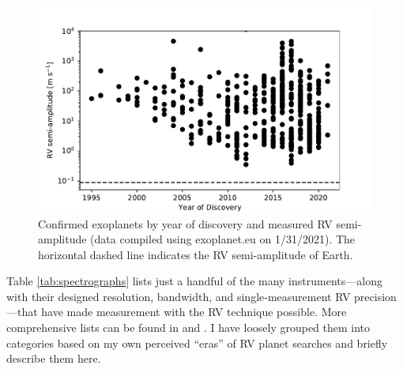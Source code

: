 \begin{figure}
    \centering
    \includegraphics{figures-1/rv-exoplanets.pdf}
    \caption{Confirmed exoplanets by year of discovery and measured RV semi-amplitude (data compiled using exoplanet.eu on 1/31/2021). The horizontal dashed line indicates the RV semi-amplitude of Earth.}
    \label{fig:rv-exoplanets}
\end{figure}

Table \ref{tab:spectrographs} lists just a handful of the many instruments---along with their designed resolution, bandwidth, and single-measurement RV precision---that have made measurement with the RV technique possible. More comprehensive lists can be found in \citet{fischer_state_2016} and \citet{wright_third_2017}. I have loosely grouped them into categories based on my own perceived ``eras'' of RV planet searches and briefly describe them here.

